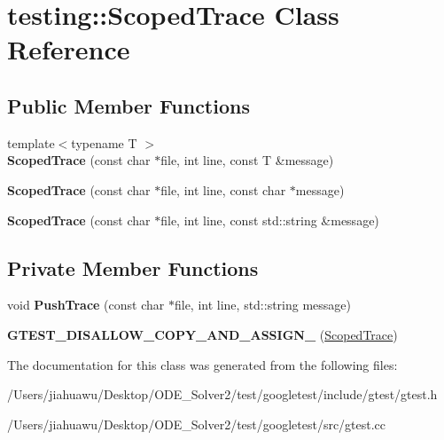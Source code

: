 \hypertarget{classtesting_1_1_scoped_trace}{}\section{testing\+:\+:Scoped\+Trace Class Reference}
\label{classtesting_1_1_scoped_trace}
\subsection*{Public Member Functions}
\begin{DoxyCompactItemize}
\item 
\mbox{\label{classtesting_1_1_scoped_trace_a2da90b95d682d518cca472934d53c59c}} 
{\footnotesize template$<$typename T $>$ }\\{\bfseries Scoped\+Trace} (const char $\ast$file, int line, const T \&message)
\item 
\mbox{\label{classtesting_1_1_scoped_trace_accd2a06cc941ffd7d6fe109adfdb4f19}} 
{\bfseries Scoped\+Trace} (const char $\ast$file, int line, const char $\ast$message)
\item 
\mbox{\label{classtesting_1_1_scoped_trace_a1f453a2aade0db6955a111a7cb329615}} 
{\bfseries Scoped\+Trace} (const char $\ast$file, int line, const std\+::string \&message)
\end{DoxyCompactItemize}
\subsection*{Private Member Functions}
\begin{DoxyCompactItemize}
\item 
\mbox{\label{classtesting_1_1_scoped_trace_a905304c342012d6ae1493a1ad3b62255}} 
void {\bfseries Push\+Trace} (const char $\ast$file, int line, std\+::string message)
\item 
\mbox{\label{classtesting_1_1_scoped_trace_aed447fe36b38f99ace904ed52c206eb0}} 
{\bfseries G\+T\+E\+S\+T\+\_\+\+D\+I\+S\+A\+L\+L\+O\+W\+\_\+\+C\+O\+P\+Y\+\_\+\+A\+N\+D\+\_\+\+A\+S\+S\+I\+G\+N\+\_\+} (\mbox{\hyperlink{classtesting_1_1_scoped_trace}{Scoped\+Trace}})
\end{DoxyCompactItemize}


The documentation for this class was generated from the following files\+:\begin{DoxyCompactItemize}
\item 
/\+Users/jiahuawu/\+Desktop/\+O\+D\+E\+\_\+\+Solver2/test/googletest/include/gtest/gtest.\+h\item 
/\+Users/jiahuawu/\+Desktop/\+O\+D\+E\+\_\+\+Solver2/test/googletest/src/gtest.\+cc\end{DoxyCompactItemize}
